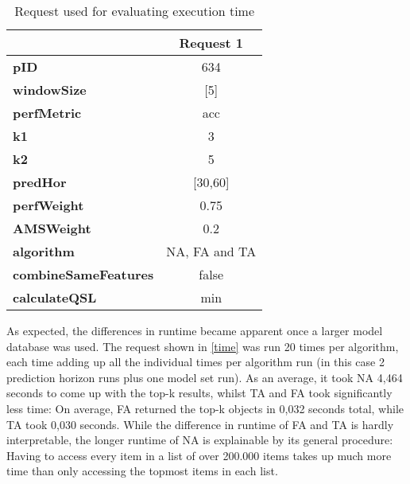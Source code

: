 \begin{table}[h]
\centering
    \begin{tabular}{ l | c}
        \toprule
        &
\textbf{Request 1}      
 \\\midrule

\textbf{pID} & 634 \\\midrule
\textbf{windowSize} & [5] \\\midrule
\textbf{perfMetric} & acc  \\\midrule
\textbf{k1} & 3\\\midrule
\textbf{k2} & 5 \\\midrule
\textbf{predHor} & [30,60]\\\midrule
\textbf{perfWeight} & 0.75 \\\midrule
\textbf{AMSWeight} & 0.2\\\midrule
\textbf{algorithm}  & NA, FA and TA  \\\midrule
\textbf{combineSameFeatures} & false \\\midrule
\textbf{calculateQSL} & min \\
        \bottomrule
    \end{tabular}
\caption{Request used for evaluating execution time} \label{time}
\end{table}


As expected, the differences in runtime became apparent once a larger model database was used. The request shown in \autoref{time} was run 20 times per algorithm, each time adding up all the individual times per algorithm run (in this case 2 prediction horizon runs plus one model set run). As an average, it took NA 4,464 seconds to come up with the top-k results, whilst TA and FA took significantly less time: On average, FA returned the top-k objects in 0,032 seconds total, while TA took 0,030 seconds. While the difference in runtime of FA and TA is hardly interpretable, the longer runtime of NA is explainable by its general procedure: Having to access every item in a list of over 200.000 items takes up much more time than only accessing the topmost items in each list. 


